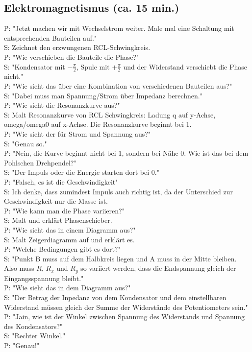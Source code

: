 \documentclass[10pt]{article}
\begin{document}
\begin{multicols}{2}
\section{Elektromagnetismus (ca. 15 min.)}
P: "Jetzt machen wir mit Wechselstrom weiter. Male mal eine Schaltung mit entsprechenden Bauteilen auf."\\
S: Zeichnet den erzwungenen RCL-Schwingkreis.\\
P: "Wie verschieben die Bauteile die Phase?"\\
S: "Kondensator mit \(-\frac{\pi}{2}\), Spule mit \(+\frac{\pi}{2}\) und der Widerstand verschiebt die Phase nicht."\\
P: "Wie sieht das über eine Kombination von verschiedenen Bauteilen aus?"\\
S: "Dabei muss man Spannung/Strom über Impedanz berechnen."\\
P: "Wie sieht die Resonanzkurve aus?"\\
S: Malt Resonanzkurve von RCL Schwingkreis: Ladung q auf y-Achse, omega/omega0 auf x-Achse. Die Resonanzkurve beginnt bei 1.\\
P: "Wie sieht der für Strom und Spannung aus?"\\
S: "Genau so."\\
P: "Nein, die Kurve beginnt nicht bei 1, sondern bei Nähe 0. Wie ist das bei dem Pohlschen Drehpendel?"\\
S: "Der Impuls oder die Energie starten dort bei 0."\\
P: "Falsch, es ist die Geschwindigkeit"\\
S: Ich denke, dass zumindest Impuls auch richtig ist, da der Unterschied zur Geschwindigkeit nur die Masse ist.\\
P: "Wie kann man die Phase variieren?"\\
S: Malt und erklärt Phasenschieber.\\
P: "Wie sieht das in einem Diagramm aus?"\\
S: Malt Zeigerdiagramm auf und erklärt es.\\
P: "Welche Bedingungen gibt es dort?"\\
S: "Punkt B muss auf dem Halbkreis liegen und A muss in der Mitte bleiben. Also muss \(R\), \(R_x\) und \(R_y\) so variiert werden, dass die Endspannung gleich der Eingangsspannung bleibt."\\
P: "Wie sieht das in dem Diagramm aus?"\\
S: "Der Betrag der Inpedanz von dem Kondensator und dem einstellbaren Widerstand müssen gleich der Summe der Widerstände des Potentiometers sein."\\
P: "Jain, wie ist der Winkel zwischen Spannung des Widerstands und Spannung des Kondensators?"\\
S: "Rechter Winkel."\\
P: "Genau!"\\

\end{multicols}
\end{document}
